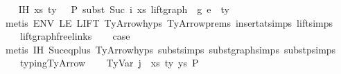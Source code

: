\begin{isabellebody}
\isanewline
\ \ \isamarkupfalse%
\ IH{\isacharcolon}{\kern0pt}\ {\isachardoublequoteopen}{\isacharparenleft}{\kern0pt}xs{\isacharprime}{\kern0pt}{\isacharcomma}{\kern0pt}\ ty{}{\isacharprime}{\kern0pt}{\isacharparenright}{\kern0pt}\ {\isacharhash}{\kern0pt}\ {\isasymGamma}{}\ {\isasymturnstile}{\isacharbraceleft}{\kern0pt}P{\isacharbraceright}{\kern0pt}\ {\isacharparenleft}{\kern0pt}subst\ {\isacharparenleft}{\kern0pt}Suc\ i{\isacharparenright}{\kern0pt}\ xs\ {\isacharparenleft}{\kern0pt}lift{\isacharunderscore}{\kern0pt}graph\ {}\ g{}{\isacharparenright}{\kern0pt}{\isacharparenright}{\kern0pt}\ e{\isacharprime}{\kern0pt}\ {\isacharcolon}{\kern0pt}\ ty{}{\isacharprime}{\kern0pt}{\isachardoublequoteclose}\isanewline
\ \ \ \ \isamarkupfalse%
\ {\isacharparenleft}{\kern0pt}metis\ ENV\ LE\ LIFT{}\ TyArrow{\isachardot}{\kern0pt}hyps{\isacharparenleft}{\kern0pt}{}{\isacharparenright}{\kern0pt}\ TyArrow{\isachardot}{\kern0pt}prems{\isacharparenleft}{\kern0pt}{}{\isacharcomma}{\kern0pt}{}{\isacharparenright}{\kern0pt}\ insert{\isacharunderscore}{\kern0pt}at{\isachardot}{\kern0pt}simps{\isacharparenleft}{\kern0pt}{}{\isacharparenright}{\kern0pt}\ lift{\isachardot}{\kern0pt}simps{\isacharparenleft}{\kern0pt}{}{\isacharparenright}{\kern0pt}\isanewline
\ \ \ \ lift{\isacharunderscore}{\kern0pt}graph{\isacharunderscore}{\kern0pt}freelinks{\isacharparenright}{\kern0pt}\isanewline
\ \ \isamarkupfalse%
\ {\isacharquery}{\kern0pt}case\isanewline
\ \ \ \ \isamarkupfalse%
\ {\isacharparenleft}{\kern0pt}metis\ IH\ Suc{\isacharunderscore}{\kern0pt}eq{\isacharunderscore}{\kern0pt}plus{}\ TyArrow{\isachardot}{\kern0pt}hyps{\isacharparenleft}{\kern0pt}{}{\isacharcomma}{\kern0pt}{}{\isacharparenright}{\kern0pt}\ subst{\isachardot}{\kern0pt}simps{\isacharparenleft}{\kern0pt}{}{\isacharparenright}{\kern0pt}\ subst{\isacharunderscore}{\kern0pt}graph{\isachardot}{\kern0pt}simps{\isacharparenleft}{\kern0pt}{}{\isacharparenright}{\kern0pt}\ subst{\isacharunderscore}{\kern0pt}p{\isachardot}{\kern0pt}simps{\isacharparenleft}{\kern0pt}{}{\isacharparenright}{\kern0pt}\isanewline
\ \ \ \ typing{\isachardot}{\kern0pt}TyArrow{\isacharparenright}{\kern0pt}\isanewline
\isanewline
{}\isamarkupfalse%
\isanewline
\ \ \isamarkupfalse%
\ {\isacharparenleft}{\kern0pt}TyVar\ j\ {\isasymGamma}\ xs{\isacharprime}{\kern0pt}\ ty{\isacharprime}{\kern0pt}\ ys\ P{\isacharparenright}{\kern0pt}\isanewline

\end{isabellebody}
